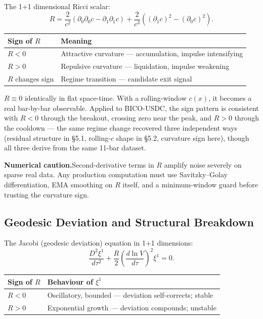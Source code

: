 \documentclass[12pt,a4paper]{article}
\begin{document}
The 1+1 dimensional Ricci scalar:
\begin{equation}
    R = \frac{2}{c^2}\!\left(\partial_0\partial_0 c - \partial_1\partial_1 c\right)
      + \frac{2}{c^3}\!\left((\partial_1 c)^2 - (\partial_0 c)^2\right).
\end{equation}

\begin{center}
\begin{tabular}{ll}
\toprule
Sign of $R$ & Meaning \\
\midrule
$R < 0$ & Attractive curvature --- accumulation, impulse intensifying \\
$R > 0$ & Repulsive curvature --- liquidation, impulse weakening \\
$R$ changes sign & Regime transition --- candidate exit signal \\
\bottomrule
\end{tabular}
\end{center}

$R\equiv0$ identically in flat space-time. With a rolling-window $c(x)$,
it becomes a real bar-by-bar observable. Applied to BICO-USDC, the sign
pattern is consistent with $R<0$ through the breakout, crossing zero near
the peak, and $R>0$ through the cooldown --- the same regime change
recovered three independent ways (residual structure in \S5.1, rolling-$c$
shape in \S5.2, curvature sign here), though all three derive from the same
11-bar dataset.

\textbf{Numerical caution.}\quad Second-derivative terms in $R$ amplify
noise severely on sparse real data. Any production computation must use
Savitzky--Golay differentiation, EMA smoothing on $R$ itself, and a
minimum-window guard before trusting the curvature sign.

\subsection{Geodesic Deviation and Structural Breakdown}

The Jacobi (geodesic deviation) equation in 1+1 dimensions:
\begin{equation}
    \frac{D^2\xi^1}{d\tau^2} + \frac{R}{2}\left(\frac{d\ln V}{d\tau}\right)^2\xi^1 = 0.
\end{equation}

\begin{center}
\begin{tabular}{ll}
\toprule
Sign of $R$ & Behaviour of $\xi^1$ \\
\midrule
$R < 0$ & Oscillatory, bounded --- deviation self-corrects; stable \\
$R > 0$ & Exponential growth --- deviation compounds; unstable \\
\bottomrule
\end{tabular}
\end{center}
\end{document}
